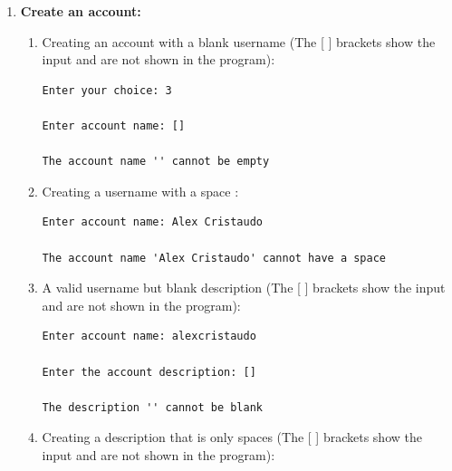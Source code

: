 \documentclass{assignment}
\begin{document}
\begin{enumerate}
\begin{enumerate}
\begin{center}
{\begin{BVerbatim}
No accounts
\end{BVerbatim} 
}
\end{center} \color{black}
    \end{enumerate}

    
\item \textbf{Create an account: } 
\begin{enumerate}
   
    \item Creating an account with a blank username (The [ ] brackets show the input and are not shown in the program):
        \begin{center}
\small {

\color{gray}
\begin{BVerbatim}
Enter your choice: 3

Enter account name: []

The account name '' cannot be empty
\end{BVerbatim} 

}

\end{center} \color{black}
        
    \item Creating a username with a space :
        \begin{center}
\small{
\color{gray}
\begin{BVerbatim}
Enter account name: Alex Cristaudo

The account name 'Alex Cristaudo' cannot have a space
\end{BVerbatim}
}
\end{center} \color{black}

    \item A valid username but blank description (The [ ] brackets show the input and are not shown in the program):
        \begin{center}
\small{
\color{gray}
\begin{BVerbatim}
Enter account name: alexcristaudo

Enter the account description: []

The description '' cannot be blank
\end{BVerbatim} 
}
\end{center} \color{black}

    \item Creating a description that is only spaces (The [ ] brackets show the input and are not shown in the program):
        \begin{center}
\color{gray}
\small{
\begin{BVerbatim}
    

\end{BVerbatim}}
\end{center}
\end{enumerate}
\end{enumerate}
\end{document}
